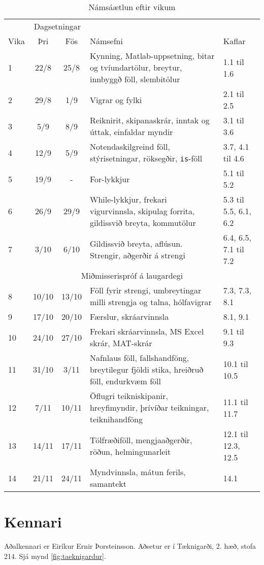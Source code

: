 \documentclass[justified, nobib]{tufte-handout}
\begin{document}
\begin{table*}
\caption{Námsáætlun eftir vikum}
\label{tab:schedule}
\begin{center}
\renewcommand{\arraystretch}{1.2}
\begin{tabularx}{\linewidth}{lccXp{3cm}}
\toprule
&\multicolumn{2}{c}{Dagsetningar}&&\\
\cmidrule{2-3}
Vika&Þri&Fös&Námsefni&Kaflar\\
\midrule
1	&22/8	&25/8	& Kynning, Matlab-uppsetning, bitar og tvíundartölur, breytur, innbyggð föll, slembitölur &1.1 til 1.6\\
2	&29/8	&1/9	& Vigrar og fylki&2.1 til 2.5\\
3	&5/9	&8/9	& Reiknirit, skipanaskrár, inntak og úttak, einfaldar myndir&3.1 til 3.6\\
4	&12/9	&5/9	& Notendaskilgreind föll, stýrisetningar, röksegðir, \texttt{is}-föll&3.7, 4.1 til 4.6\\
5	&19/9	&-	    & For-lykkjur&5.1 til 5.2\\
6	&26/9	&29/9	& While-lykkjur, frekari vigurvinnsla, skipulag forrita, gildissvið breyta, kommutölur&5.3 til 5.5, 6.1, 6.2\\
7	&3/10	&6/10	& Gildissvið breyta, aflúsun. Strengir, aðgerðir á strengi&6.4, 6.5, 7.1 til 7.2\\
\cmidrule{4-4}
\multicolumn{5}{c}{Miðmisserispróf á laugardegi}\\
\cmidrule{4-4}
8	&10/10	&13/10	& Föll fyrir strengi, umbreytingar milli strengja og talna, hólfavigrar&7.3, 7.3, 8.1\\
9	&17/10	&20/10	& Færslur, skráarvinnsla&8.1, 9.1\\
10	&24/10	&27/10	& Frekari skráarvinnsla, MS Excel skrár, MAT-skrár&9.1 til 9.3\\
11	&31/10	&3/11	& Nafnlaus föll, fallshandföng, breytilegur fjöldi stika, hreiðruð föll, endurkvæm föll&10.1 til 10.5\\
12	&7/11	&10/11	& Öflugri teikniskipanir, hreyfimyndir, þrívíðar teikningar, teiknihandföng&11.1 til 11.7\\
13	&14/11	&17/11	& Tölfræðiföll, mengjaaðgerðir, röðun, helmingunarleit&12.1 til 12.3, 12.5\\
14	&21/11	&24/11	& Myndvinnsla, mátun ferils, samantekt&14.1\\
\bottomrule
\end{tabularx}
\end{center}
\end{table*}

\section{Kennari}
Aðalkennari er Eiríkur Ernir Þorsteinsson. Aðsetur er í Tæknigarði, 2. hæð, stofa 214. Sjá mynd \ref{fig:taeknigardur}.
\end{document}
